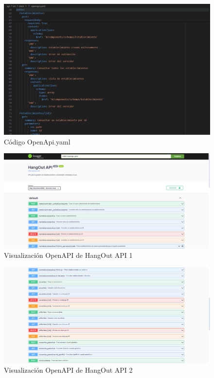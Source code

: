 \begin{landscape}
\thispagestyle{empty}
\begin{figure}[H]
    \centering
    \includegraphics[width=\linewidth]{imagenes/OpenApi.png}
    \caption{Código OpenApi.yaml}
    \label{fig:OpenApiCod}
\end{figure}
\end{landscape}

\clearpage
\begin{landscape}
\thispagestyle{empty}
\begin{figure}[H]
    \centering
    \includegraphics[width=\linewidth]{imagenes/OpenApi1.png}
    \caption{Visualización OpenAPI de HangOut API 1}
    \label{fig:OpenApi1}
\end{figure}
\end{landscape}

\clearpage
\begin{landscape}
\thispagestyle{empty}
\begin{figure}[H]
    \centering
    \includegraphics[width=\linewidth]{imagenes/OpenApi2.png}
    \caption{Visualización OpenAPI de HangOut API 2}
    \label{fig:OpenApi2}
\end{figure}
\end{landscape}

